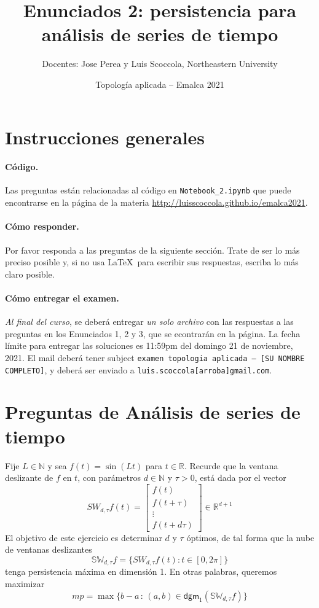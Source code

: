 \documentclass[12pt,reqno,oneside]{article}
\title{Enunciados 2: persistencia para an\'alisis de series de tiempo}
\date{Topolog\'{i}a aplicada -- Emalca 2021 }
\author{Docentes: Jose Perea y Luis Scoccola, Northeastern University}
\DeclareRobustCommand\squelch[1]{%
    \BeginAccSupp{method=plain,ActualText={}}#1\EndAccSupp{}}
\theoremstyle{definition}
\begin{document}
\maketitle

\section{Instrucciones generales}
%
\paragraph{C\'odigo.}
Las preguntas est\'an relacionadas al c\'odigo en \texttt{Notebook\_2.ipynb} que puede encontrarse en la p\'agina de la materia
\url{http://luisscoccola.github.io/emalca2021}.

\paragraph{C\'omo responder.}
Por favor responda a las preguntas de la siguiente secci\'on. 
Trate de ser lo m\'as preciso posible y, si no usa \LaTeX~para escribir sus respuestas, escriba lo m\'as claro posible.

\paragraph{C\'omo entregar el examen.}
\textit{Al final del curso}, se deber\'a entregar \textit{un solo archivo} con las respuestas a las preguntas en los Enunciados 1, 2 y 3, que se econtrar\'an en la p\'agina.
La fecha l\'imite para entregar las soluciones es 11:59pm del domingo 21 de noviembre, 2021.
El mail deber\'a tener subject \texttt{examen topologia aplicada -- [SU NOMBRE COMPLETO]}, y deber\'a ser enviado a \squelch{\texttt{luis.scoccola[arroba]gmail.com}}.

\section{Preguntas de An\'alisis de series de tiempo}

Fije $L\in \mathbb{N}$ y sea $f(t) = \sin(Lt)$ para $t\in \mathbb{R}$. 
Recurde que la ventana deslizante de $f$ en $t$, con par\'ametros $d \in \mathbb{N}$ 
y $\tau >0$, est\'a dada por el vector 
\[
SW_{d,\tau} f (t) = 
\begin{bmatrix}
f(t) \\ f(t + \tau) \\  \vdots \\ f(t + d\tau)
\end{bmatrix}
\in \mathbb{R}^{d+1}
\]
El objetivo de este ejercicio es determinar   $d $ y $\tau$ \'optimos, 
de tal forma que la nube de ventanas deslizantes 
\[
\mathbb{SW}_{d,\tau} f = \big\{SW_{d,\tau} f(t) : t\in [0,2\pi]\big\}
\]
tenga persistencia m\'axima en dimensi\'on 1. 
En otras palabras, queremos maximizar
\begin{equation}\label{eq:MaxPers}
mp = \max\Big\{b - a\, :\, (a,b) \in \mathsf{dgm}_1(\mathbb{SW}_{d,\tau} f )\Big\}
\end{equation}
\end{document}
